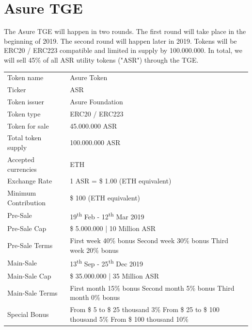 \section{Asure TGE}

The Asure TGE will happen in two rounds. The first round will take place in the beginning of 2019. The second round will happen later in 2019. Tokens will be ERC20 / ERC223 compatible and limited in supply by 100.000.000. In total, we will sell 45\% of all ASR utility tokens ("ASR") through the TGE. 

\begin{table}[H]
\begin{tabular}{lp{}l}
  Token name & Asure Token \\  
  Ticker & ASR\\
  Token issuer & Asure Foundation\\
  Token type & ERC20 / ERC223 \\
  Token for sale & 45.000.000 ASR \\
  Total token supply & 100.000.000 ASR \\
  Accepted currencies & ETH \\
  Exchange Rate & 1 ASR = \$ 1.00 (ETH equivalent) \\
  Minimum Contribution & \$ 100 (ETH equivalent) \\\hline  
  
  Pre-Sale & 19\textsuperscript{th} Feb - 12\textsuperscript{th} Mar 2019 \\
  Pre-Sale Cap & \$ 5.000.000 | 10 Million ASR\\
  Pre-Sale Terms & First week 40\% bonus\newline
                   Second week 30\% bonus\newline
                   Third week 20\%  bonus\\\hline
  
  Main-Sale & 13\textsuperscript{th} Sep - 25\textsuperscript{th} Dec 2019 \\  
  Main-Sale Cap & \$ 35.000.000 | 35 Million ASR\\
  Main-Sale Terms & First month 15\% bonus\newline
                    Second month 5\% bonus\newline
                    Third month 0\% bonus\\\hline

  Special Bonus & 
From \$ 5 to \$ 25 thousand  3\%\newline
From \$ 25 to \$ 100 thousand  5\%\newline
From \$ 100 thousand 10\%\\\hline


\end{tabular}
\end{table}
